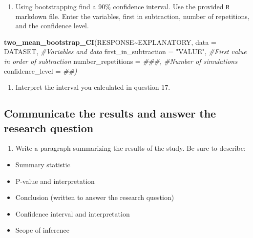 \documentclass[
]{report}
\newenvironment{Shaded}{\begin{snugshade}}{\end{snugshade}}
\newcommand{\CommentTok}[1]{\textcolor[rgb]{0.56,0.35,0.01}{\textit{#1}}}
\newcommand{\DataTypeTok}[1]{\textcolor[rgb]{0.13,0.29,0.53}{#1}}
\newcommand{\KeywordTok}[1]{\textcolor[rgb]{0.13,0.29,0.53}{\textbf{#1}}}
\newcommand{\NormalTok}[1]{#1}
\newcommand{\OperatorTok}[1]{\textcolor[rgb]{0.81,0.36,0.00}{\textbf{#1}}}
\newcommand{\StringTok}[1]{\textcolor[rgb]{0.31,0.60,0.02}{#1}}
\providecommand{\tightlist}{%
  \setlength{\itemsep}{0pt}\setlength{\parskip}{0pt}}
\begin{document}
\begin{enumerate}
\def\labelenumi{\arabic{enumi}.}
\setcounter{enumi}{16}
\tightlist
\item
  Using bootstrapping find a 90\% confidence interval. Use the provided \texttt{R} markdown file. Enter the variables, first in subtraction, number of repetitions, and the confidence level.
\end{enumerate}

\begin{Shaded}
\begin{Highlighting}[]
\KeywordTok{two\_mean\_bootstrap\_CI}\NormalTok{(RESPONSE}\OperatorTok{\textasciitilde{}}\NormalTok{EXPLANATORY, }\DataTypeTok{data =}\NormalTok{ DATASET,  }\CommentTok{\#Variables and data}
                      \DataTypeTok{first\_in\_subtraction =} \StringTok{"VALUE"}\NormalTok{, }\CommentTok{\#First value in order of subtraction}
                      \DataTypeTok{number\_repetitions =} \CommentTok{\#\#\#,  \#Number of simulations}
                      \DataTypeTok{confidence\_level =} \CommentTok{\#\#)}
\end{Highlighting}
\end{Shaded}

\begin{enumerate}
\def\labelenumi{\arabic{enumi}.}
\setcounter{enumi}{17}
\tightlist
\item
  Interpret the interval you calculated in question 17.
\end{enumerate}

\vspace{1in}

\hypertarget{communicate-the-results-and-answer-the-research-question}{%
\subsection*{Communicate the results and answer the research question}\label{communicate-the-results-and-answer-the-research-question}}

\begin{enumerate}
\def\labelenumi{\arabic{enumi}.}
\setcounter{enumi}{18}
\tightlist
\item
  Write a paragraph summarizing the results of the study. Be sure to describe:
\end{enumerate}

\begin{itemize}
\item
  Summary statistic
\item
  P-value and interpretation
\item
  Conclusion (written to answer the research question)
\item
  Confidence interval and interpretation
\item
  Scope of inference
\end{itemize}
\end{document}

